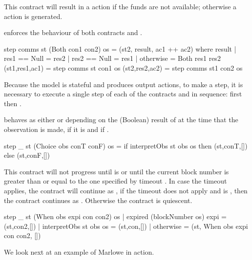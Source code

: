 \documentclass[runningheads]{llncs}
\begin{document}
This contract will result in a  action if the funds are not available; otherwise a 
 action is generated.

\medskip
\noindent
{} enforces the behaviour of both contracts  and . 
\begin{haskellcode}
step comms st (Both con1 con2) os =
    (st2, result, ac1 ++ ac2)
    where
        result | res1 == Null = res2
               | res2 == Null = res1
               | otherwise = Both res1 res2
        (st1,res1,ac1) = step comms st con1 os
        (st2,res2,ac2) = step comms st1 con2 os
\end{haskellcode}
Because the model is stateful and produces output actions, to make a step, it is necessary to execute a single step of 
each of  the contracts  and  in sequence: first  then 
.

\medskip
\noindent
{} behaves as either  or  depending on the 
(Boolean) result of  at the time that the observation is made,  if it is 
 and  if .

\begin{haskellcode}
step _ st (Choice obs conT conF) os =
    if interpretObs st obs os
        then (st,conT,[])
        else (st,conF,[])
\end{haskellcode}

\medskip
\noindent
{} This contract will not progress until  is 
 or until the current block number is greater than or equal to the one specified by timeout 
. In case the timeout applies, the contract will continue as , if the timeout 
does not apply and  is , then the contract continues as . 
Otherwise the contract is quiescent.

\begin{haskellcode}
step _ st (When obs expi con con2) os
  | expired (blockNumber os) expi = (st,con2,[])
  | interpretObs st obs os = (st,con,[])
  | otherwise = (st, When obs expi con con2, [])
  \end{haskellcode}
We look next at an example of Marlowe in action.
\end{document}
